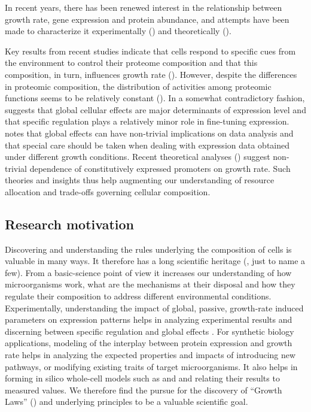 \documentclass[a4page,notitlepage]{article}
\begin{document}
In recent years, there has been renewed interest in the relationship between growth rate, gene expression and protein abundance, and attempts have been made to characterize it experimentally (\cite{Zaslaver2009a,Levy2009,Berthoumieux2013}) and theoretically (\cite{Klumpp2009a,Scott2010b}).

Key results from recent studies indicate that cells respond to specific cues from the environment to control their proteome composition and that this composition, in turn, influences growth rate (\cite{Levy2009}).
However, despite the differences in proteomic composition, the distribution of activities among proteomic functions seems to be relatively constant (\cite{Zaslaver2009a}).
In a somewhat contradictory fashion, \cite{Berthoumieux2013} suggests that global cellular effects are major determinants of expression level and that specific regulation plays a relatively minor role in fine-tuning expression.
\cite{loven2012} notes that global effects can have non-trivial implications on data analysis and that special care should be taken when dealing with expression data obtained under different growth conditions.
Recent theoretical analyses (\cite{Klumpp2009a,Scott2010b}) suggest non-trivial dependence of constitutively expressed promoters on growth rate.
Such theories and insights thus help augmenting our understanding of resource allocation and trade-offs governing cellular composition.

\subsection{Research motivation}
Discovering and understanding the rules underlying the composition of cells is valuable in many ways.
It therefore has a long scientific heritage (\cite{Schaechter1958, Maaloe1969, Bremer1987, Klumpp2009a}, just to name a few).
From a basic-science point of view it increases our understanding of how microorganisms work, what are the mechanisms at their disposal and how they regulate their composition to address different environmental conditions.
Experimentally, understanding the impact of global, passive, growth-rate induced parameters on expression patterns helps in analyzing experimental results and discerning between specific regulation and global effects \cite{loven2012}.
For synthetic biology applications, modeling of the interplay between protein expression and growth rate helps in analyzing the expected properties and impacts of introducing new pathways, or modifying existing traits of target microorganisms.
It also helps in forming in silico whole-cell models such as \cite{Lerman2012} and \cite{Karr2012} and relating their results to measured values.
We therefore find the pursue for the discovery of ``Growth Laws'' (\cite{Scott2010b}) and underlying principles to be a valuable scientific goal.
\end{document}
